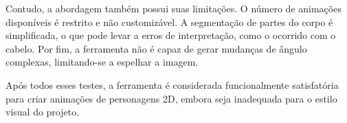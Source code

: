 Contudo, a abordagem também possui suas limitações. O número de animações disponíveis é restrito e não customizável. A segmentação de partes do corpo é simplificada, o que pode levar a erros de interpretação, como o ocorrido com o cabelo. Por fim, a ferramenta não é capaz de gerar mudanças de ângulo complexas, limitando-se a espelhar a imagem.


Após todos esses testes, a ferramenta é considerada funcionalmente satisfatória para criar animações de personagens 2D, embora seja inadequada para o estilo visual do projeto. 


